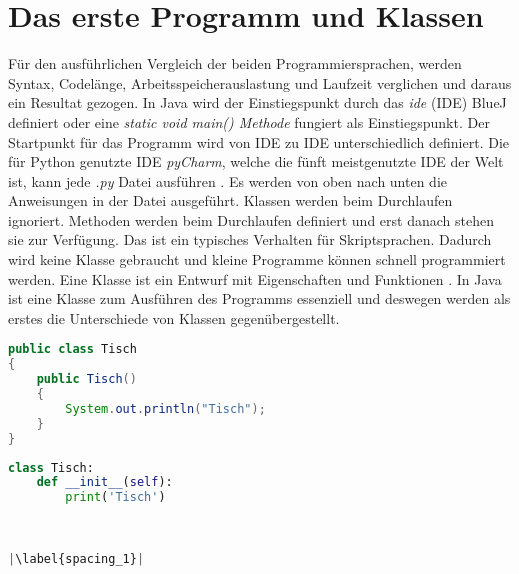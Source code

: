 \section{Das erste Programm und Klassen}
Für den ausführlichen Vergleich der beiden Programmiersprachen, werden Syntax, Codelänge, Arbeitsspeicherauslastung und Laufzeit verglichen und daraus ein Resultat gezogen.
In Java wird der Einstiegspunkt durch das \textit{\acrlong{ide}} (IDE) BlueJ definiert oder eine \textit{static void main() Methode} fungiert als Einstiegspunkt. 
Der Startpunkt für das Programm wird von IDE zu IDE unterschiedlich definiert. 
Die für Python genutzte IDE \textit{pyCharm}, welche die fünft meistgenutzte IDE der Welt ist, kann jede \textit{.py} Datei ausführen \cite{Github:IDE}\cite{PyCharm}.
Es werden von oben nach unten die Anweisungen in der Datei ausgeführt.
Klassen werden beim Durchlaufen ignoriert.
Methoden werden beim Durchlaufen definiert und erst danach stehen sie zur Verfügung.
Das ist ein typisches Verhalten für Skriptsprachen.
Dadurch wird keine Klasse gebraucht und kleine Programme können schnell programmiert werden. 
Eine Klasse ist ein Entwurf mit Eigenschaften und Funktionen \cite{gfg}. 
In Java ist eine Klasse zum Ausführen des Programms essenziell und deswegen werden als erstes die Unterschiede von Klassen gegenübergestellt.

\begin{minipage}{.5\linewidth}
\begin{lstlisting}[language=java,caption={Klasse in Java},captionpos=b,label={lst:java:class},frame=none]
public class Tisch
{
    public Tisch()
    {
        System.out.println("Tisch");
    }
}
\end{lstlisting}
\end{minipage}
\begin{minipage}{.5\linewidth}
\begin{lstlisting}[language=python,caption={Klasse in Python},captionpos=b,label={lst:python:class},frame=l,escapechar=|]
class Tisch:
    def __init__(self):
        print('Tisch')
        
        

|\label{spacing_1}|
\end{lstlisting}
\end{minipage}

